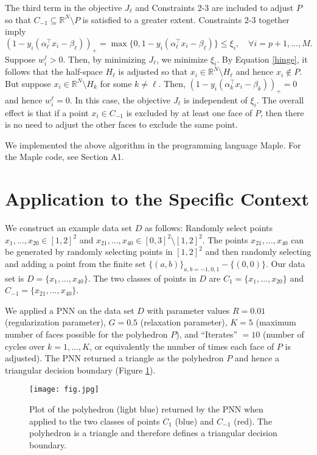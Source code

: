 \documentclass[12pt, a4paper, notitlepage]{report}
\newcommand{\RR}{\mathbb{R}}
\begin{document}
The third term in the objective $J_\ell$ and Constraints 2-3 are included to adjust $P$ so that $C_{-1}\subseteq \RR^N\setminus P$ is satisfied to a greater extent. Constraints 2-3 together imply
\[ (1-y_i(\alpha_\ell^\top x_i-\beta_\ell))_+
= \max\{0, 1-y_i(\alpha_\ell^\top x_i-\beta_\ell)\} \leq \xi_i, \quad\forall i=p+1,\ldots,M. \]
Suppose $w_i^\ell >0$. Then, by minimizing $J_\ell$, we minimize $\xi_i$. By Equation \ref{hinge}, it follows that the half-space $H_\ell$ is adjusted so that $x_i\in \RR^N\setminus H_\ell$ and hence $x_i\notin P$. But suppose $x_i\in\RR^N\setminus H_k$ for some $k\neq\ell$. Then, $(1-y_i(\alpha_k^\top x_i-\beta_k))_+=0$ and hence $w_i^\ell=0$. In this case, the objective $J_\ell$ is independent of $\xi_i$. The overall effect is that if a point $x_i\in C_{-1}$ is excluded by at least one face of $P$, then there is no need to adjust the other faces to exclude the same point.

We implemented the above algorithm in the programming language Maple. For the Maple code, see Section A1.

\section{Application to the Specific Context} \label{Application}

We construct an example data set $D$ as follows: Randomly select points $x_1,\ldots,x_{20}\in [1,2]^2$ and $x_{21},\ldots,x_{40}\in [0,3]^2\setminus [1,2]^2$. The points $x_{21},\ldots,x_{40}$ can be generated by randomly selecting points in $[1,2]^2$ and then randomly selecting and adding a point from the finite set $\{(a,b)\}_{a,b=-1,0,1}-\{(0,0)\}$. Our data set is $D=\{x_1,\ldots,x_{40}\}$. The two classes of points in $D$ are $C_1=\{x_1,\ldots,x_{20}\}$ and $C_{-1}=\{x_{21},\ldots,x_{40}\}$.

We applied a PNN on the data set $D$ with parameter values $R=0.01$ (regularization parameter), $G=0.5$ (relaxation parameter), $K=5$ (maximum number of faces possible for the polyhedron $P$), and ``Iterates'' $= 10$ (number of cycles over $k=1,\ldots,K$, or equivalently the number of times each face of $P$ is adjusted). The PNN returned a triangle as the polyhedron $P$ and hence a triangular decision boundary (Figure \ref{figure}).

\begin{figure}
\centering
\texttt{[image: fig.jpg]}
\caption{\label{figure} Plot of the polyhedron (light blue) returned by the PNN when applied to the two classes of points $C_1$ (blue) and $C_{-1}$ (red). The polyhedron is a triangle and therefore defines a triangular decision boundary.}
\end{figure}
\end{document}
